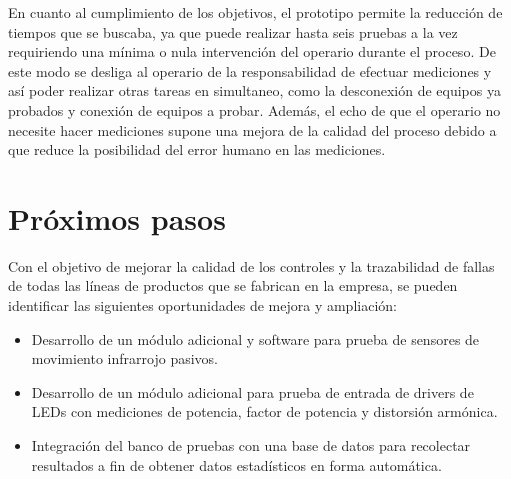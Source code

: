 En cuanto al cumplimiento de los objetivos, el prototipo permite la reducción de tiempos que se buscaba, ya que puede realizar hasta seis pruebas a la vez requiriendo una mínima o nula intervención del operario durante el proceso. De este modo se desliga al operario de la responsabilidad de efectuar mediciones y así poder realizar otras tareas en simultaneo, como la desconexión de equipos ya probados y conexión de equipos a probar. Además, el echo de que el operario no necesite hacer mediciones supone una mejora de la calidad del proceso debido a que reduce la posibilidad del error humano en las mediciones.




\section{Próximos pasos}

Con el objetivo de mejorar la calidad de los controles y la trazabilidad de fallas de todas las líneas de productos que se fabrican en la empresa, se pueden identificar las siguientes oportunidades de mejora y ampliación:

\begin{itemize}
\item Desarrollo de un módulo adicional y software para prueba de sensores de movimiento infrarrojo pasivos.
\item Desarrollo de un módulo adicional para prueba de entrada de drivers de LEDs con mediciones de potencia, factor de potencia y distorsión armónica.
\item Integración del banco de pruebas con una base de datos para recolectar resultados a fin de obtener datos estadísticos en forma automática.
\end{itemize}
